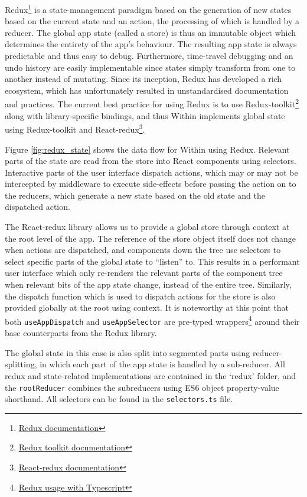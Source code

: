 Redux\footnote{\href{https://redux.js.org/usage/usage-with-typescript}{Redux documentation}} is a state-management paradigm based on the generation of new states based on the current state and an action, the processing of which is handled by a reducer. The global app state (called a store) is thus an immutable object which determines the entirety of the app's behaviour. The resulting app state is always predictable and thus easy to debug. Furthermore, time-travel debugging and an undo history are easily implementable since states simply transform from one to another instead of mutating. Since its inception, Redux has developed a rich ecosystem, which has unfortunately resulted in unstandardised documentation and practices. The current best practice for using Redux is to use Redux-toolkit\footnote{\href{https://redux-toolkit.js.org}{Redux toolkit documentation}} along with library-specific bindings, and thus Within implements global state using Redux-toolkit and React-redux\footnote{\href{https://react-redux.js.org}{React-redux documentation}}.

Figure \ref{fig:redux_state} shows the data flow for Within using Redux. Relevant parts of the state are read from the store into React components using selectors. Interactive parts of the user interface dispatch actions, which may or may not be intercepted by middleware to execute side-effects before passing the action on to the reducers, which generate a new state based on the old state and the dispatched action.

The React-redux library allows us to provide a global store through context at the root level of the app. The reference of the store object itself does not change when actions are dispatched, and components down the tree use selectors to select specific parts of the global state to ``listen'' to. This results in a performant user interface which only re-renders the relevant parts of the component tree when relevant bits of the app state change, instead of the entire tree. Similarly, the dispatch function which is used to dispatch actions for the store is also provided globally at the root using context. It is noteworthy at this point that both \texttt{useAppDispatch} and \texttt{useAppSelector} are pre-typed wrappers\footnote{\href{https://redux.js.org/usage/usage-with-typescript}{Redux usage with Typescript}} around their base counterparts from the Redux library.

The global state in this case is also split into segmented parts using reducer-splitting, in which each part of the app state is handled by a sub-reducer. All redux and state-related implementations are contained in the `redux' folder, and the \texttt{rootReducer} combines the subreducers using ES6 object property-value shorthand. All selectors can be found in the \texttt{selectors.ts} file.


